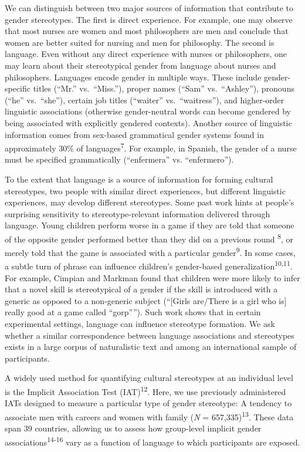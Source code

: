 \documentclass[11pt]{wlscirep}
\begin{document}
We can distinguish between two major sources of information that contribute to gender stereotypes. The first is direct experience. For
example, one may observe that most nurses are women and most
philosophers are men and conclude that women are better suited for
nursing and men for philosophy. The second is language. Even without any
direct experience with nurses or philosophers, one may learn about their
stereotypical gender from language about nurses and philosophers.
Languages encode gender in multiple ways. These include gender-specific
titles (\enquote{Mr.} vs.\ \enquote{Miss.}), proper names (\enquote{Sam}
vs.\ \enquote{Ashley}), pronouns (\enquote{he} vs.\ \enquote{she}),
certain job titles (\enquote{waiter} vs.\ \enquote{waitress}), and
higher-order linguistic associations (otherwise gender-neutral words can
become gendered by being associated with explicitly gendered contexts).
Another source of linguistic information comes from sex-based
grammatical gender systems found in approximately 30\% of languages\textsuperscript{7}. For example, in Spanish, the gender of a
nurse must be specified grammatically (\enquote{enfermera} vs.
\enquote{enfermero}).

To the extent that language is a source of information for forming
cultural stereotypes, two people with similar direct experiences, but
different linguistic experiences, may develop different stereotypes.
Some past work hints at people's surprising sensitivity to
stereotype-relevant information delivered through language. Young
children perform worse in a game if they are told that someone of the
opposite gender performed better than they did on a previous round
\textsuperscript{8}, or merely told that the game is associated
with a particular gender\textsuperscript{9}. In some
cases, a subtle turn of phrase can influence children's gender-based
generalization\textsuperscript{10,11}. For example, Cimpian and Markman found that children were more likely to infer that a novel skill is stereotypical of a
gender if the skill is introduced with a generic as opposed to a
non-generic subject (``{[}Girls are/There is a girl who is{]} really
good at a game called ``gorp''''). Such work shows that in certain
experimental settings, language can influence stereotype formation. We ask whether a similar correspondence between language associations and stereotypes exists in a large corpus of naturalistic text and among an international sample of participants. 

A widely used method for quantifying cultural stereotypes at an
individual level is the Implicit Association Test (IAT)\textsuperscript{12}. Here, we use previously administered IATs designed to measure a particular type of gender
stereotype: A tendency to associate men with careers and women with family
(\emph{N} = 657,335)\textsuperscript{13}. These data span 39 countries, allowing us to assess how group-level implicit gender associations\textsuperscript{14-16} vary as a function of language to which participants are exposed. 
\end{document}
